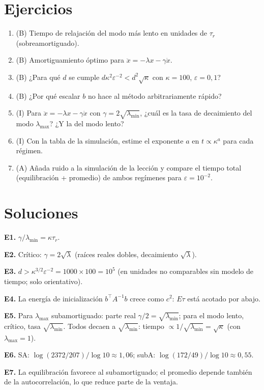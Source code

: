 \documentclass[11pt,a4paper]{article}
\begin{document}
\section{Ejercicios}
\begin{enumerate}[label=\textbf{E\arabic*.}]
\item (B) Tiempo de relajación del modo más lento en unidades de $\tau_r$ (sobreamortiguado).
\item (B) Amortiguamiento óptimo para $\ddot x=-\lambda x-\gamma\dot x$.
\item (B) ¿Para qué $d$ se cumple $d\kappa^2\varepsilon^{-2}<d^2\sqrt\kappa$ con $\kappa=100$, $\varepsilon=0{,}1$?
\item (B) ¿Por qué escalar $b$ no hace al método arbitrariamente rápido?
\item (I) Para $\ddot x=-\lambda x-\gamma\dot x$ con $\gamma=2\sqrt{\lambda_{\min}}$, ¿cuál es la tasa de decaimiento del modo $\lambda_{\max}$? ¿Y la del modo lento?
\item (I) Con la tabla de la simulación, estime el exponente $a$ en $t\propto\kappa^a$ para cada régimen.
\item (A) Añada ruido a la simulación de la lección y compare el tiempo total (equilibración + promedio) de ambos regímenes para $\varepsilon=10^{-2}$.
\end{enumerate}
\section{Soluciones}
\begin{solucion}
\textbf{E1.} $\gamma/\lambda_{\min}=\kappa\tau_r$.

\textbf{E2.} Crítico: $\gamma=2\sqrt\lambda$ (raíces reales dobles, decaimiento $\sqrt\lambda$).

\textbf{E3.} $d>\kappa^{3/2}\varepsilon^{-2}=1000\times100=10^5$ (en unidades no comparables sin modelo de tiempo; solo orientativo).

\textbf{E4.} La energía de inicialización $b^\top A^{-1}b$ crece como $c^2$: $E\tau$ está acotado por abajo.

\textbf{E5.} Para $\lambda_{\max}$ subamortiguado: parte real $\gamma/2=\sqrt{\lambda_{\min}}$; para el modo lento, crítico, tasa $\sqrt{\lambda_{\min}}$. Todos decaen a $\sqrt{\lambda_{\min}}$: tiempo $\propto1/\sqrt{\lambda_{\min}}=\sqrt\kappa$ (con $\lambda_{\max}=1$).

\textbf{E6.} SA: $\log(2372/207)/\log10\approx1{,}06$; subA: $\log(172/49)/\log10\approx0{,}55$.

\textbf{E7.} La equilibración favorece al subamortiguado; el promedio depende también de la autocorrelación, lo que reduce parte de la ventaja.
\end{solucion}
\end{document}
